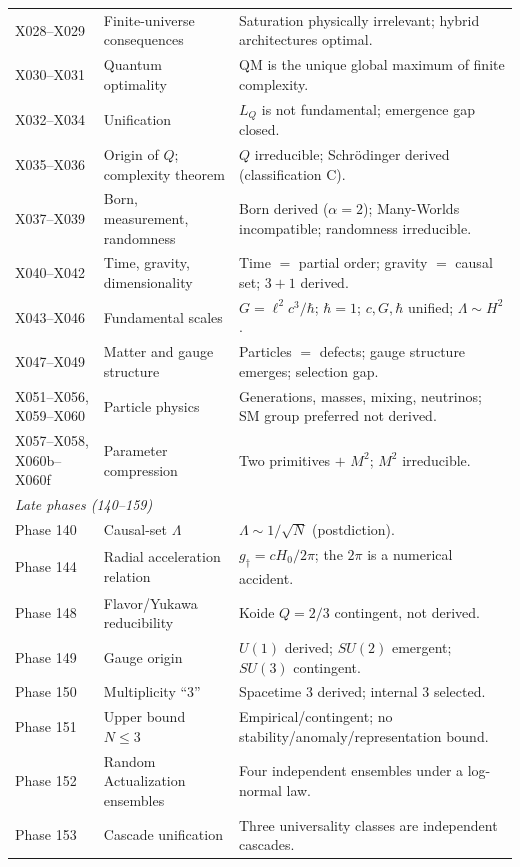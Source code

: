 \documentclass[10pt,twoside,openany]{book}
\begin{document}
\begin{longtable}{p{4.2cm}p{5.2cm}p{5.6cm}}
X028--X029 & Finite-universe consequences & Saturation physically irrelevant; hybrid architectures optimal. \\
X030--X031 & Quantum optimality & QM is the unique global maximum of finite complexity. \\
X032--X034 & Unification & $L_Q$ is not fundamental; emergence gap closed. \\
X035--X036 & Origin of $Q$; complexity theorem & $Q$ irreducible; Schr\"odinger derived (classification C). \\
X037--X039 & Born, measurement, randomness & Born derived ($\alpha=2$); Many-Worlds incompatible; randomness irreducible. \\
X040--X042 & Time, gravity, dimensionality & Time $=$ partial order; gravity $=$ causal set; $3{+}1$ derived. \\
X043--X046 & Fundamental scales & $G=\ell^2c^3/\hbar$; $\hbar=1$; $c,G,\hbar$ unified; $\Lambda\sim H^2$. \\
X047--X049 & Matter and gauge structure & Particles $=$ defects; gauge structure emerges; selection gap. \\
X051--X056, X059--X060 & Particle physics & Generations, masses, mixing, neutrinos; SM group preferred not derived. \\
X057--X058, X060b--X060f & Parameter compression & Two primitives $+$ $M^2$; $M^2$ irreducible. \\
\midrule
\multicolumn{3}{l}{\emph{Late phases (140--159)}} \\
\midrule
Phase 140 & Causal-set $\Lambda$ & $\Lambda\sim1/\sqrt N$ (postdiction). \\
Phase 144 & Radial acceleration relation & $g_\dagger=cH_0/2\pi$; the $2\pi$ is a numerical accident. \\
Phase 148 & Flavor/Yukawa reducibility & Koide $Q=2/3$ contingent, not derived. \\
Phase 149 & Gauge origin & $U(1)$ derived; $SU(2)$ emergent; $SU(3)$ contingent. \\
Phase 150 & Multiplicity ``3'' & Spacetime 3 derived; internal 3 selected. \\
Phase 151 & Upper bound $N\le3$ & Empirical/contingent; no stability/anomaly/representation bound. \\
Phase 152 & Random Actualization ensembles & Four independent ensembles under a log-normal law. \\
Phase 153 & Cascade unification & Three universality classes are independent cascades. \\

\end{longtable}
\end{document}
